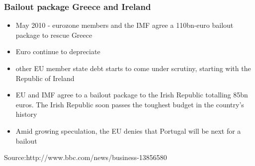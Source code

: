 \documentclass[11pt]{beamer}
\begin{document}
\begin{frame}
\frametitle{Bailout package Greece and Ireland}
\begin{itemize}
\item May 2010 - eurozone members and the IMF agree a 110bn-euro bailout package to rescue Greece
\item Euro continue to depreciate
\item other EU member state debt starts to come under scrutiny, starting with the Republic of Ireland
\item EU and IMF agree to a bailout package to the Irish Republic totalling 85bn euros. The Irish Republic soon passes the toughest budget in the country's history
\item Amid growing speculation, the EU denies that Portugal will be next for a bailout
\end{itemize}
\tiny{Source:http://www.bbc.com/news/business-13856580}
\end{frame}



\end{document}

